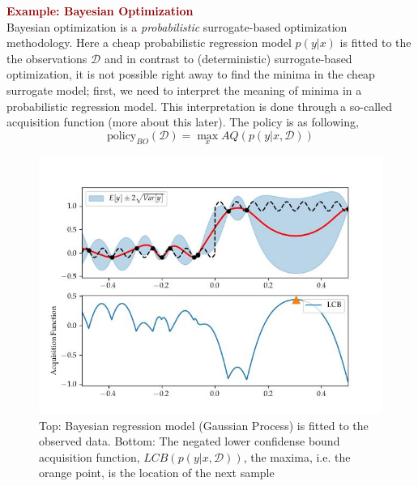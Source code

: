 \begin{tcolorbox}[
    sharp corners,
    boxrule=0mm,
    enhanced,
    borderline west={4pt}{-2pt}{darkred},
    borderline north={1pt}{0pt}{darkred},
    borderline south={1pt}{0pt}{darkred},
    borderline east={1pt}{0pt}{darkred},
    colframe=darkred!10,
    coltitle=darkred,
]
{ \textcolor{darkred}{\textbf{Example: Bayesian Optimization}}}\\
    Bayesian optimization is a \textit{probabilistic} surrogate-based optimization
    methodology. Here a cheap probabilistic regression model $p(y|x)$ is fitted to the
    the observations $\mathcal{D}$ and in contrast to (deterministic) surrogate-based
    optimization, it is not possible right away to find the minima in the cheap
    surrogate model; first, we need to interpret the meaning of minima in a probabilistic
    regression model. This interpretation is done through a so-called acquisition
    function (more about this later). The policy is as following,
    $$\text{policy}_{BO}(\mathcal{D}) = \max_x AQ(p(y|x,\mathcal{D}))$$

    \begin{figure}[H]
        \begin{minipage}[c]{0.67\textwidth}
          \includegraphics[width=\textwidth]{Pictures/SimonsTestGaussian Process - sklearn002.jpg}
        \end{minipage}\hfill
        \begin{minipage}[c]{0.3\textwidth}
          \caption{Top: Bayesian regression model (Gaussian Process) is fitted to the
          observed data. Bottom: The negated lower confidense bound acquisition function,
          $LCB(p(y|x,\mathcal{D}))$, the maxima, i.e. the orange point, is the location of the
          next sample} \label{fig:03-03}
        \end{minipage}
    \end{figure}
   

\end{tcolorbox}
